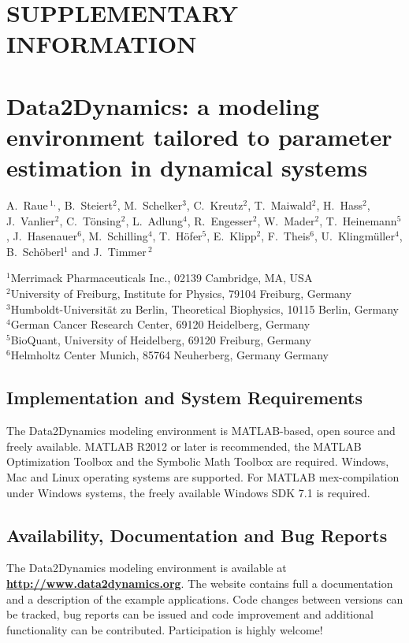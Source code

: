\documentclass[12pt,a4paper]{scrartcl}
\begin{document}
\section*{SUPPLEMENTARY INFORMATION}
\section*{Data2Dynamics: a modeling environment tailored to parameter 
estimation in dynamical systems}

\noindent 
A.~Raue\,$^{1,}$, 
B.~Steiert$^{2}$, 
M.~Schelker$^{3}$, 
C.~Kreutz$^{2}$, 
T.~Maiwald$^{2}$, 
H.~Hass$^{2}$, 
J.~Vanlier$^{2}$, 
C.~T\"onsing$^{2}$, 
L.~Adlung$^{4}$, 
R.~Engesser$^{2}$, 
W.~Mader$^{2}$, 
T.~Heinemann$^{5}$, 
J.~Hasenauer$^{6}$, 
M.~Schilling$^{4}$, 
T.~H\"ofer$^{5}$, 
E.~Klipp$^{2}$, 
F.~Theis$^{6}$, 
U.~Klingm\"uller$^{4}$, 
B.~Sch\"oberl$^{1}$ and 
J.~Timmer\,$^{2}$

\noindent $^{1}$Merrimack Pharmaceuticals Inc., 02139 Cambridge, MA, USA\\
$^{2}$University of Freiburg, Institute for Physics, 79104 Freiburg, Germany\\
$^{3}$Humboldt-Universit\"at zu Berlin, Theoretical Biophysics, 10115 Berlin, Germany\\
$^{4}$German Cancer Research Center, 69120 Heidelberg, Germany\\
$^{5}$BioQuant, University of Heidelberg, 69120 Freiburg, Germany\\
$^{6}$Helmholtz Center Munich, 85764 Neuherberg, Germany
Germany

\subsection*{Implementation and System Requirements} 
The Data2Dynamics modeling environment is MATLAB-based, 
open source and freely available. 
MATLAB R2012 or later is recommended, the MATLAB 
Optimization Toolbox and the Symbolic Math Toolbox are required. 
Windows, Mac and Linux operating systems are supported. 
For MATLAB mex-compilation under Windows systems, 
the freely available Windows SDK 7.1 is required.

\subsection*{Availability, Documentation and Bug Reports}
The Data2Dynamics modeling environment is available at 
\href{http://www.data2dynamics.org}{{\bf http://www.data2dynamics.org}}. 
The website contains full a documentation and a 
description of the example applications. Code changes between versions can be tracked, 
bug reports can be issued and code improvement 
and additional functionality can be contributed. Participation is highly welcome! 
\end{document}
